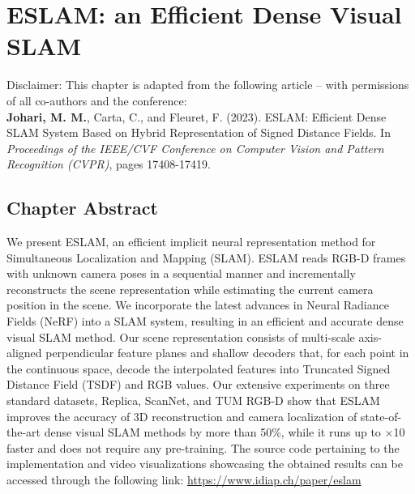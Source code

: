 \chapter{ESLAM: an Efficient Dense Visual SLAM}

\begin{tcolorbox}[colback=gray!20, boxrule=1pt, colframe=black]
  Disclaimer: This chapter is adapted from the following article – with permissions of all co-authors and the conference: \\

    \textbf{Johari, M. M.}, Carta, C., and Fleuret, F. (2023). ESLAM: Efficient Dense SLAM System Based on Hybrid Representation of Signed Distance Fields. In \textit{Proceedings of the IEEE/CVF Conference on Computer Vision and Pattern Recognition (CVPR)}, pages 17408-17419.
\end{tcolorbox}

\section{Chapter Abstract} \label{sec:chapter4}

We present ESLAM, an efficient implicit neural representation method for Simultaneous Localization and Mapping (SLAM). ESLAM reads RGB-D frames with unknown camera poses in a sequential manner and incrementally reconstructs the scene representation while estimating the current camera position in the scene. We incorporate the latest advances in Neural Radiance Fields (NeRF) into a SLAM system, resulting in an efficient and accurate dense visual SLAM method. Our scene representation consists of multi-scale axis-aligned perpendicular feature planes and shallow decoders that, for each point in the continuous space, decode the interpolated features into Truncated Signed Distance Field (TSDF) and RGB values. Our extensive experiments on three standard datasets, Replica, ScanNet, and TUM RGB-D show that ESLAM improves the accuracy of 3D reconstruction and camera localization of state-of-the-art dense visual SLAM methods by more than 50\%, while it runs up to $\times$10 faster and does not require any pre-training. The source code pertaining to the implementation and video visualizations showcasing the obtained results can be accessed through the following link: \href{https://www.idiap.ch/paper/eslam}{https://www.idiap.ch/paper/eslam}

